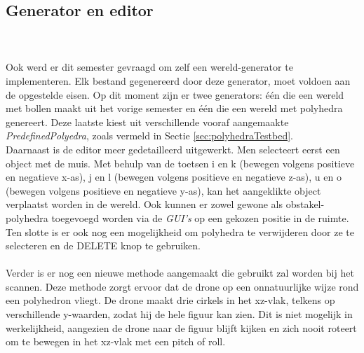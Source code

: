\subsection{Generator en editor}
\\\\
Ook werd er dit semester gevraagd om zelf een wereld-generator te implementeren. Elk bestand gegenereerd door deze generator, moet voldoen aan de opgestelde eisen. Op dit moment zijn er twee generators: één die een wereld met bollen maakt uit het vorige semester en één die een wereld met polyhedra genereert. Deze laatste kiest uit verschillende vooraf aangemaakte \textit{PredefinedPolyedra}, zoals vermeld in Sectie \ref{sec:polyhedraTestbed}.
\\

\noindent
Daarnaast is de editor meer gedetailleerd uitgewerkt. Men selecteert eerst een object met de muis. Met behulp van de toetsen i en k (bewegen volgens positieve en negatieve x-as), j en l (bewegen volgens positieve en negatieve z-as), u en o (bewegen volgens positieve en negatieve y-as), kan het aangeklikte object verplaatst worden in de wereld. Ook kunnen er zowel gewone als obstakel-polyhedra toegevoegd worden via de \textit{GUI's} op een gekozen positie in de ruimte. Ten slotte is er ook nog een mogelijkheid om polyhedra te verwijderen door ze te selecteren en de DELETE knop te gebruiken. 
\\\\
\noindent
Verder is er nog een nieuwe methode aangemaakt die gebruikt zal worden bij het scannen. Deze methode zorgt ervoor dat de drone op een onnatuurlijke wijze rond een polyhedron vliegt. De drone maakt drie cirkels in het xz-vlak, telkens op verschillende y-waarden, zodat hij de hele figuur kan zien. Dit is niet mogelijk in werkelijkheid, aangezien de drone naar de figuur blijft kijken en zich nooit roteert om te bewegen in het xz-vlak met een pitch of roll.
